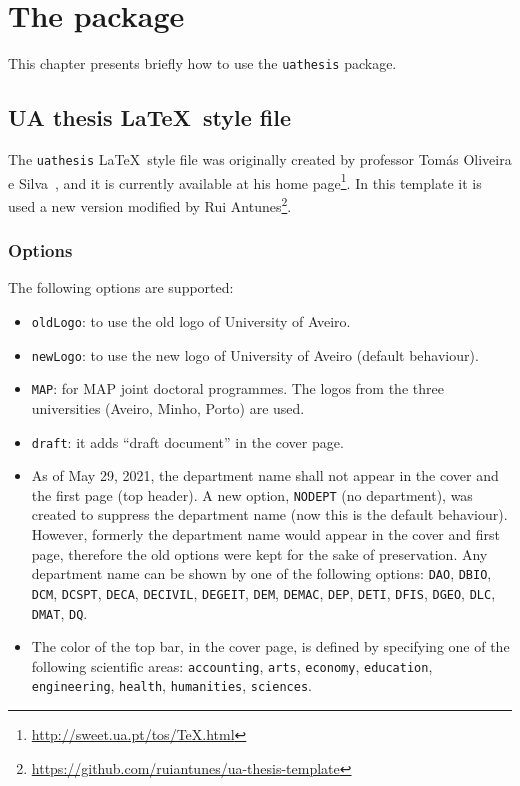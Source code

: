 \chapter{The package}
\label{ch:the-package}

This chapter presents briefly how to use the \verb+uathesis+ package.

\section{UA thesis \LaTeX\ style file}
\label{sec:uathesis-style-file}

The \verb+uathesis+ \LaTeX\ style file was originally created by professor Tomás Oliveira e Silva~\parencite*{silva2012a}, and it is currently available at his home page\footnote{\url{http://sweet.ua.pt/tos/TeX.html}}. In this template it is used a new version modified by Rui Antunes\footnote{\url{https://github.com/ruiantunes/ua-thesis-template}}.

\subsection{Options}
\label{ssec:options}

The following options are supported:

\begin{itemize}

\item
\texttt{oldLogo}: to use the old logo of University of Aveiro.

\item
\texttt{newLogo}: to use the new logo of University of Aveiro (default behaviour).

\item
\texttt{MAP}: for MAP joint doctoral programmes. The logos from the three universities (Aveiro, Minho, Porto) are used.

\item
\texttt{draft}: it adds ``draft document'' in the cover page.

\item
As of May 29, 2021, the department name shall not appear in the cover and the first page (top header). A new option, \texttt{NODEPT} (no department), was created to suppress the department name (now this is the default behaviour).\\
However, formerly the department name would appear in the cover and first page, therefore the old options were kept for the sake of preservation. Any department name can be shown by one of the following options: \texttt{DAO}, \texttt{DBIO}, \texttt{DCM}, \texttt{DCSPT}, \texttt{DECA}, \texttt{DECIVIL}, \texttt{DEGEIT}, \texttt{DEM}, \texttt{DEMAC}, \texttt{DEP}, \texttt{DETI}, \texttt{DFIS}, \texttt{DGEO}, \texttt{DLC}, \texttt{DMAT}, \texttt{DQ}.

\item
The color of the top bar, in the cover page, is defined by specifying one of the following scientific areas: \texttt{accounting}, \texttt{arts}, \texttt{economy}, \texttt{education}, \texttt{engineering}, \texttt{health}, \texttt{humanities}, \texttt{sciences}.

\end{itemize}

